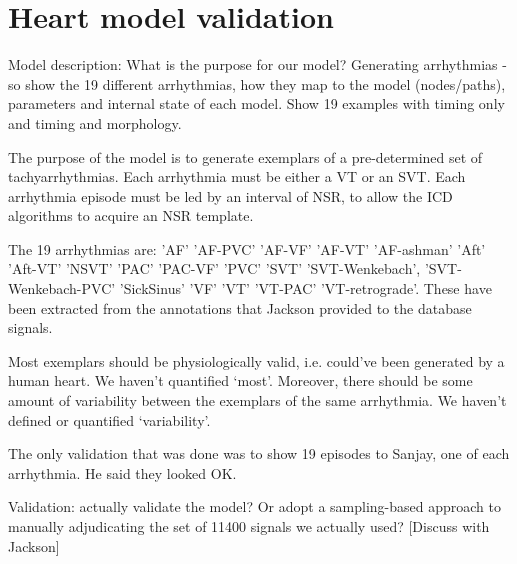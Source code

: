 \section{Heart model validation}
\label{sec:heart model validation}

Model description: What is the purpose for our model? Generating arrhythmias - so show the 19 different arrhythmias, how they map to the model (nodes/paths), parameters and internal state of each model. Show 19 examples with timing only and timing and morphology. 

The purpose of the model is to generate exemplars of a pre-determined set of tachyarrhythmias.
Each arrhythmia must be either a VT or an SVT.
Each arrhythmia episode must be led by an interval of NSR, to allow the ICD algorithms to acquire an NSR template.

The 19 arrhythmias are:
'AF'    'AF-PVC'    'AF-VF'    'AF-VT'    'AF-ashman'    'Aft'    'Aft-VT'    'NSVT'    'PAC'    'PAC-VF'    'PVC'    'SVT'    'SVT-Wenkebach', 'SVT-Wenkebach-PVC'    'SickSinus'    'VF'    'VT'    'VT-PAC'    'VT-retrograde'.
These have been extracted from the annotations that Jackson provided to the database signals.

Most exemplars should be physiologically valid, i.e. could've been generated by a human heart.
We haven't quantified `most'. 
Moreover, there should be some amount of variability between the exemplars of the same arrhythmia.
We haven't defined or quantified `variability'.

The only validation that was done was to show 19 episodes to Sanjay, one of each arrhythmia.
He said they looked OK.

Validation: actually validate the model? Or adopt a sampling-based approach to manually adjudicating the set of 11400 signals we actually used? [Discuss with Jackson]

